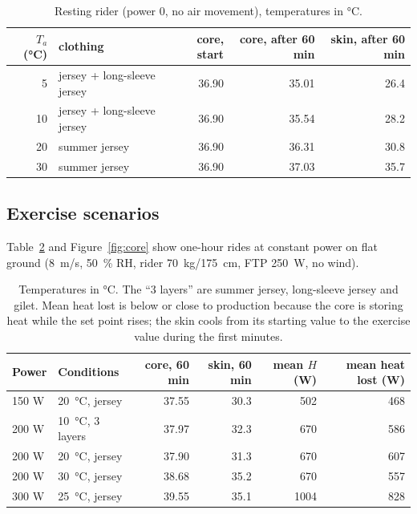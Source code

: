 \documentclass[11pt,a4paper]{article}
\begin{document}
\begin{table}[H]
\centering\small
\begin{tabular}{@{}rlrrr@{}}
\toprule
\(T_a\) (\si{\degreeCelsius}) & clothing & core, start & core, after 60 min & skin, after 60 min \\
\midrule
5 & jersey + long-sleeve jersey & 36.90 & 35.01 & 26.4 \\
10 & jersey + long-sleeve jersey & 36.90 & 35.54 & 28.2 \\
20 & summer jersey & 36.90 & 36.31 & 30.8 \\
30 & summer jersey & 36.90 & 37.03 & 35.7 \\
\bottomrule
\end{tabular}
\caption{Resting rider (power 0, no air movement), temperatures in \si{\degreeCelsius}.}\label{tab:rest}
\end{table}

\subsection{Exercise scenarios}
Table~\ref{tab:scen} and Figure~\ref{fig:core} show one-hour rides at constant power on flat ground (\SI{8}{m/s}, \SI{50}{\percent} RH, rider \SI{70}{kg}/\SI{175}{cm}, FTP \SI{250}{W}, no wind).

\begin{table}[H]
\centering\small
\begin{tabular}{@{}llrrrr@{}}
\toprule
Power & Conditions & core, 60 min & skin, 60 min & mean \(H\) (W) & mean heat lost (W) \\
\midrule
150 W & \SI{20}{\degreeCelsius}, jersey & 37.55 & 30.3 & 502 & 468 \\
200 W & \SI{10}{\degreeCelsius}, 3 layers & 37.97 & 32.3 & 670 & 586 \\
200 W & \SI{20}{\degreeCelsius}, jersey & 37.90 & 31.3 & 670 & 607 \\
200 W & \SI{30}{\degreeCelsius}, jersey & 38.68 & 35.2 & 670 & 557 \\
300 W & \SI{25}{\degreeCelsius}, jersey & 39.55 & 35.1 & 1004 & 828 \\
\bottomrule
\end{tabular}
\caption{Temperatures in \si{\degreeCelsius}. The ``3 layers'' are summer jersey, long-sleeve jersey and gilet. Mean heat lost is below or close to production because the core is storing heat while the set point rises; the skin cools from its starting value to the exercise value during the first minutes.}\label{tab:scen}
\end{table}
\end{document}
